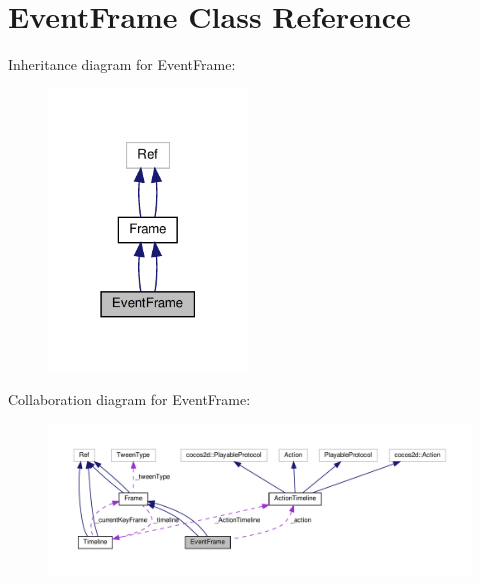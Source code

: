 \hypertarget{classEventFrame}{}\section{Event\+Frame Class Reference}
\label{classEventFrame}


Inheritance diagram for Event\+Frame\+:
\nopagebreak
\begin{figure}[H]
\begin{center}
\leavevmode
\includegraphics[width=150pt]{classEventFrame__inherit__graph}
\end{center}
\end{figure}


Collaboration diagram for Event\+Frame\+:
\nopagebreak
\begin{figure}[H]
\begin{center}
\leavevmode
\includegraphics[width=350pt]{classEventFrame__coll__graph}
\end{center}
\end{figure}
